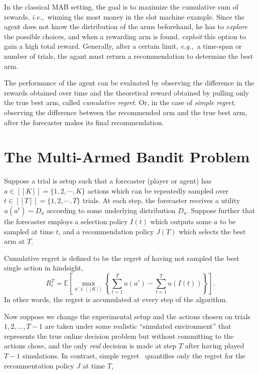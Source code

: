 \documentclass{kecsmstr}
\newcommand{\bE}{\mathbb{E}}
\newcommand{\eg}{{\it e.g.,}~}
\newcommand{\ie}{{\it i.e.,}~}
\begin{document}
In the classical MAB setting, the goal is to maximize the cumulative sum of rewards, \ie winning the most money in the slot machine example. Since the agent does not know the distribution of the arms beforehand, he has to \emph{explore} the possible choices, and when a rewarding arm is found, \emph{exploit} this option to gain a high total reward. Generally, after a certain limit, \eg a time-span or number of trials, the agant must return a recommendation to determine the best arm.

The performance of the agent can be evaluated by observing the difference in the rewards obtained over time and the theoretical reward obtained by pulling only the true best arm, called \emph{cumulative regret}. Or, in the case of \emph{simple regret}, observing the difference between the recommended arm and the true best arm, after the forecaster makes its final recommendation.

\section{The Multi-Armed Bandit Problem}
Suppose a trial is setup such that a forecaster (player or agent) has $a \in [[K]] = \{ 1, 2, \cdots , K \}$ actions which can be repeatedly sampled over $t \in [[T]] = \{ 1, 2, \cdots, T \}$ trials. At each step, the forecaster receives a utility $u(a^t) \sim D_a$ according to some underlying distribution $D_a$. Suppose further that the forecaster employs a selection policy $I(t)$ which outputs some $a$ to be sampled at time $t$, and a recommendation policy $J(T)$ which selects the best arm at $T$.

Cumulative regret is defined to be the regret of having not sampled the best single action in hindsight, 
\begin{equation}
R_c^T = \bE \left[ \max_{a' \in [[K]]} \left\{ \sum_{t=1}^T u(a') - \sum_{t=1}^T u(I(t)) \right\} \right].
\end{equation}
In other words, the regret is accumulated at every step of the algorithm.

Now suppose we change the experimental setup and the actions chosen on trials $1, 2, \ldots, T-1$ are taken under some realistic ``simulated environment'' that represents the true online decision problem but without committing to the actions chose, and the only {\it real} decision is made at step $T$ after having played $T-1$ simulations. In contrast, simple regret~ quantifies only the regret for the recommentation policy $J$ at time $T$,
\end{document}
